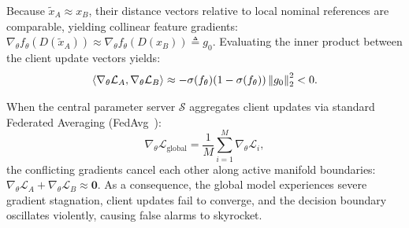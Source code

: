 Because $\tilde{x}_A \approx x_B$, their distance vectors relative to local nominal references are comparable, yielding collinear feature gradients: $\nabla_\theta f_\theta(D(\tilde{x}_A)) \approx \nabla_\theta f_\theta(D(x_B)) \triangleq g_0$. Evaluating the inner product between the client update vectors yields:
\begin{equation}
\label{eq:inner_product_cancel}
\left\langle\nabla_\theta \mathcal{L}_A,\nabla_\theta \mathcal{L}_B\right\rangle \approx -\sigma(f_\theta)(1 - \sigma(f_\theta)) \left\lVert g_0\right\rVert_2^2 < 0.
\end{equation}

When the central parameter server $\mathcal{S}$ aggregates client updates via standard Federated Averaging (FedAvg~\cite{mcmahan2017communication}):
\begin{equation}
\nabla_\theta \mathcal{L}_{\text{global}} = \frac{1}{M} \sum_{i=1}^M \nabla_\theta \mathcal{L}_i,
\end{equation}
the conflicting gradients cancel each other along active manifold boundaries: $\nabla_\theta \mathcal{L}_A + \nabla_\theta \mathcal{L}_B \approx \mathbf{0}$. As a consequence, the global model experiences severe gradient stagnation, client updates fail to converge, and the decision boundary oscillates violently, causing false alarms to skyrocket.
